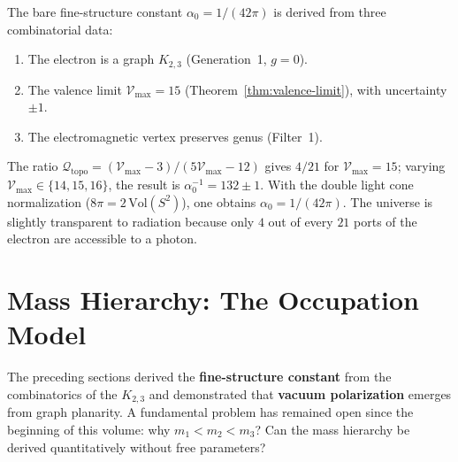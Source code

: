 \begin{result}[title={The fine-structure constant is a topological
fraction}]
\label{res:fine-structure}
The bare fine-structure constant
$\alpha_0 = 1/(42\pi)$ is derived from three combinatorial data:
\begin{enumerate}
  \item The electron is a graph $K_{2,3}$ (Generation~1, $g = 0$).
  \item The valence limit $\mathcal{V}_{\max} = 15$
    (Theorem~\ref{thm:valence-limit}), with uncertainty $\pm 1$.
  \item The electromagnetic vertex preserves genus (Filter~1).
\end{enumerate}
The ratio $\mathcal{Q}_{\mathrm{topo}} = (\mathcal{V}_{\max} - 3)/
(5\mathcal{V}_{\max} - 12)$ gives $4/21$ for $\mathcal{V}_{\max} = 15$;
varying $\mathcal{V}_{\max} \in \{14, 15, 16\}$, the result is
$\alpha_0^{-1} = 132 \pm 1$. With the double light cone normalization
($8\pi = 2\,\mathrm{Vol}(S^2)$), one obtains $\alpha_0 = 1/(42\pi)$.
The universe is slightly transparent to radiation because only
$4$ out of every $21$ ports of the electron are accessible to a photon.
\end{result}



\section{Mass Hierarchy: The Occupation Model}
\label{sec:mass-hierarchy}

The preceding sections derived the \textbf{fine-structure
constant} from the combinatorics of the $K_{2,3}$ and demonstrated that
\textbf{vacuum polarization} emerges from graph planarity.
A fundamental problem has remained open since the beginning of this
volume: why $m_1 < m_2 < m_3$? Can the mass hierarchy
be derived quantitatively without free parameters?

